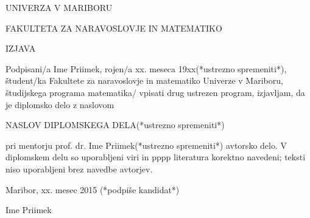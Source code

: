   \newpage

  \begin{center}
    \large
    UNIVERZA V MARIBORU

    FAKULTETA ZA NARAVOSLOVJE IN MATEMATIKO

  \end{center}

  \vspace{3cm}

  \begin{center}
    \large
    IZJAVA
  \end{center}

  \vspace{2cm}
  Podpisani/a Ime Priimek, rojen/a xx. meseca 19xx(*ustrezno spremeniti*), \v student/ka Fakultete za
  naravoslovje in matematiko Univerze v Mariboru,
  \v studijskega programa matematika/ vpisati drug ustrezen program, izjavljam,
  da je diplomsko delo z naslovom


  \begin{center}
    NASLOV DIPLOMSKEGA DELA(*ustrezno spremeniti*)
  \end{center}


  pri mentorju prof. dr. Ime Priimek(*ustrezno spremeniti*)
  avtorsko delo. V diplomskem delu so uporabljeni viri in
pppp  literatura korektno navedeni; teksti niso uporabljeni
  brez navedbe avtorjev.
  \vspace{4cm}

  Maribor, xx. mesec 2015
  (*podpi\v se kandidat*)

  \vspace{1cm}
  \begin{flushright}
    Ime Priimek\\
  \end{flushright}



